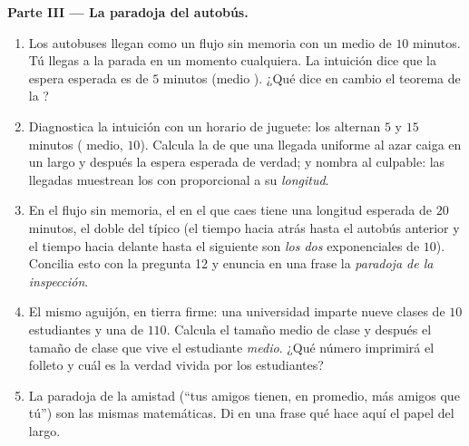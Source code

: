 \begin{problem}
\medskip
\noindent\textbf{Parte III --- La paradoja del autobús.}
\begin{enumerate}[resume]
  \item Los autobuses llegan como un flujo sin memoria con un 
        medio de $10$ minutos. Tú llegas a la parada en un momento
        cualquiera. La intuición dice que la espera esperada es de $5$
        minutos (medio ). ¿Qué dice en cambio el teorema de la
        ?
  \item Diagnostica la intuición con un horario de juguete: los 
        alternan $5$ y $15$ minutos ( medio, $10$). Calcula la
         de que una llegada uniforme al azar caiga en un
         largo y después la espera esperada de verdad; y nombra al
        culpable: las llegadas muestrean los  con 
        proporcional a su \emph{longitud}.
  \item En el flujo sin memoria, el  en el que caes tiene una
        longitud esperada de $20$ minutos, el doble del  típico
        (el tiempo hacia atrás hasta el autobús anterior y el tiempo hacia
        delante hasta el siguiente son \emph{los dos} exponenciales de
         $10$). Concilia esto con la pregunta 12 y enuncia en una
        frase la \emph{paradoja de la inspección}.
  \item El mismo aguijón, en tierra firme: una universidad imparte nueve
        clases de $10$ estudiantes y una de $110$. Calcula el tamaño medio
        de clase y después el tamaño de clase que vive el estudiante
        \emph{medio}. ¿Qué número imprimirá el folleto y cuál es la verdad
        vivida por los estudiantes?
  \item La paradoja de la amistad (``tus amigos tienen, en promedio, más
        amigos que tú'') son las mismas matemáticas. Di en una frase qué
        hace aquí el papel del  largo.
\end{enumerate}


\end{problem}
